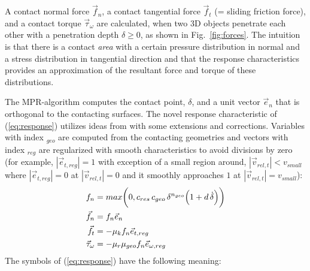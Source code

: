 A contact normal force $\vec{f}_n$, a contact tangential force $\vec{f}_t$ (= sliding friction force), 
and a contact torque $\vec{\tau}_{\omega}$ are calculated, when two 3D objects penetrate each other with a 
penetration depth $\delta \ge 0$, as shown in Fig.~\ref{fig:forces}. The intuition is that
there is a contact \emph{area} with a certain pressure distribution in normal and a stress
distribution in tangential direction and that the response characteristics provides an
approximation of the resultant force and torque of these distributions.
%

%
The MPR-algorithm computes the contact point, $\delta$, and a unit vector $\vec{e}_n$ that is orthogonal
to the contacting surfaces. The novel response characteristic of (\ref{eq:response})
utilizes ideas from \cite{Flores2011, otter2005, Skinjar2018} with some extensions
and corrections. Variables with index ${}_{geo}$ are computed from the contacting geometries and 
vectors with index ${}_{reg}$ are regularized with smooth characteristics  to avoid divisions by zero
(for example, $|\vec{e}_{t,reg}| = 1$ with exception of a small region around,
$|\vec{v}_{rel,t}| < v_{small}$ where $|\vec{e}_{t,reg}| = 0$ at
$|\vec{v}_{rel,t}| = 0$ and it smoothly approaches $1$ at $|\vec{v}_{rel,t}| = v_{small}$):
%
\begin{subequations}
\begin{align}
f_n 	  & = max \biggl( 0, c_{res} \, c_{geo} \, \delta^{n_{geo}} \Bigl( 1 + d \, \dot{\delta} \Bigl) \biggl) \\
\vec{f}_n & = f_n \vec{e}_n \\
\vec{f}_t & = - \mu_k f_n \vec{e}_{t,reg} \\
\vec{\tau}_{\omega} & = - \mu_r \mu_{geo} f_n \vec{e}_{\omega, reg}
\end{align}
\label{eq:response}
\end{subequations}
%
The symbols of (\ref{eq:response}) have the following meaning:

